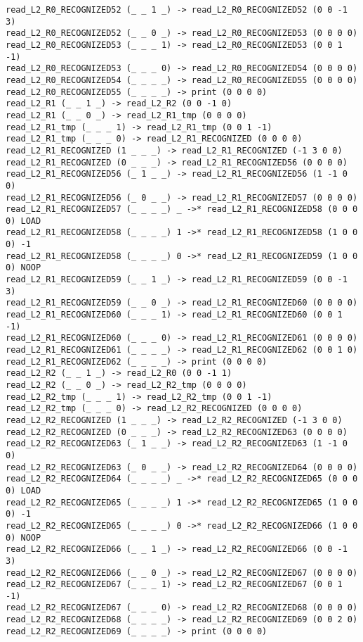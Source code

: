 \documentclass[english,shortabstract,mgr]{iithesis}
\begin{document}
\begin{verbatim}
read_L2_R0_RECOGNIZED52 (_ _ 1 _) -> read_L2_R0_RECOGNIZED52 (0 0 -1 3)
read_L2_R0_RECOGNIZED52 (_ _ 0 _) -> read_L2_R0_RECOGNIZED53 (0 0 0 0)
read_L2_R0_RECOGNIZED53 (_ _ _ 1) -> read_L2_R0_RECOGNIZED53 (0 0 1 -1)
read_L2_R0_RECOGNIZED53 (_ _ _ 0) -> read_L2_R0_RECOGNIZED54 (0 0 0 0)
read_L2_R0_RECOGNIZED54 (_ _ _ _) -> read_L2_R0_RECOGNIZED55 (0 0 0 0)
read_L2_R0_RECOGNIZED55 (_ _ _ _) -> print (0 0 0 0)
read_L2_R1 (_ _ 1 _) -> read_L2_R2 (0 0 -1 0)
read_L2_R1 (_ _ 0 _) -> read_L2_R1_tmp (0 0 0 0)
read_L2_R1_tmp (_ _ _ 1) -> read_L2_R1_tmp (0 0 1 -1)
read_L2_R1_tmp (_ _ _ 0) -> read_L2_R1_RECOGNIZED (0 0 0 0)
read_L2_R1_RECOGNIZED (1 _ _ _) -> read_L2_R1_RECOGNIZED (-1 3 0 0)
read_L2_R1_RECOGNIZED (0 _ _ _) -> read_L2_R1_RECOGNIZED56 (0 0 0 0)
read_L2_R1_RECOGNIZED56 (_ 1 _ _) -> read_L2_R1_RECOGNIZED56 (1 -1 0 0)
read_L2_R1_RECOGNIZED56 (_ 0 _ _) -> read_L2_R1_RECOGNIZED57 (0 0 0 0)
read_L2_R1_RECOGNIZED57 (_ _ _ _) _ ->* read_L2_R1_RECOGNIZED58 (0 0 0 0) LOAD
read_L2_R1_RECOGNIZED58 (_ _ _ _) 1 ->* read_L2_R1_RECOGNIZED58 (1 0 0 0) -1
read_L2_R1_RECOGNIZED58 (_ _ _ _) 0 ->* read_L2_R1_RECOGNIZED59 (1 0 0 0) NOOP
read_L2_R1_RECOGNIZED59 (_ _ 1 _) -> read_L2_R1_RECOGNIZED59 (0 0 -1 3)
read_L2_R1_RECOGNIZED59 (_ _ 0 _) -> read_L2_R1_RECOGNIZED60 (0 0 0 0)
read_L2_R1_RECOGNIZED60 (_ _ _ 1) -> read_L2_R1_RECOGNIZED60 (0 0 1 -1)
read_L2_R1_RECOGNIZED60 (_ _ _ 0) -> read_L2_R1_RECOGNIZED61 (0 0 0 0)
read_L2_R1_RECOGNIZED61 (_ _ _ _) -> read_L2_R1_RECOGNIZED62 (0 0 1 0)
read_L2_R1_RECOGNIZED62 (_ _ _ _) -> print (0 0 0 0)
read_L2_R2 (_ _ 1 _) -> read_L2_R0 (0 0 -1 1)
read_L2_R2 (_ _ 0 _) -> read_L2_R2_tmp (0 0 0 0)
read_L2_R2_tmp (_ _ _ 1) -> read_L2_R2_tmp (0 0 1 -1)
read_L2_R2_tmp (_ _ _ 0) -> read_L2_R2_RECOGNIZED (0 0 0 0)
read_L2_R2_RECOGNIZED (1 _ _ _) -> read_L2_R2_RECOGNIZED (-1 3 0 0)
read_L2_R2_RECOGNIZED (0 _ _ _) -> read_L2_R2_RECOGNIZED63 (0 0 0 0)
read_L2_R2_RECOGNIZED63 (_ 1 _ _) -> read_L2_R2_RECOGNIZED63 (1 -1 0 0)
read_L2_R2_RECOGNIZED63 (_ 0 _ _) -> read_L2_R2_RECOGNIZED64 (0 0 0 0)
read_L2_R2_RECOGNIZED64 (_ _ _ _) _ ->* read_L2_R2_RECOGNIZED65 (0 0 0 0) LOAD
read_L2_R2_RECOGNIZED65 (_ _ _ _) 1 ->* read_L2_R2_RECOGNIZED65 (1 0 0 0) -1
read_L2_R2_RECOGNIZED65 (_ _ _ _) 0 ->* read_L2_R2_RECOGNIZED66 (1 0 0 0) NOOP
read_L2_R2_RECOGNIZED66 (_ _ 1 _) -> read_L2_R2_RECOGNIZED66 (0 0 -1 3)
read_L2_R2_RECOGNIZED66 (_ _ 0 _) -> read_L2_R2_RECOGNIZED67 (0 0 0 0)
read_L2_R2_RECOGNIZED67 (_ _ _ 1) -> read_L2_R2_RECOGNIZED67 (0 0 1 -1)
read_L2_R2_RECOGNIZED67 (_ _ _ 0) -> read_L2_R2_RECOGNIZED68 (0 0 0 0)
read_L2_R2_RECOGNIZED68 (_ _ _ _) -> read_L2_R2_RECOGNIZED69 (0 0 2 0)
read_L2_R2_RECOGNIZED69 (_ _ _ _) -> print (0 0 0 0)
\end{verbatim}
\end{document}

